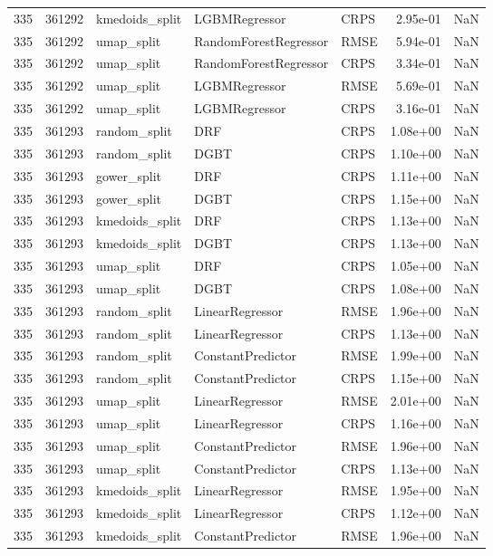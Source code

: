 \begin{tabular}{rrlllrr}
335 & 361292 & kmedoids\_split & LGBMRegressor & CRPS & 2.95e-01 & NaN \\
335 & 361292 & umap\_split & RandomForestRegressor & RMSE & 5.94e-01 & NaN \\
335 & 361292 & umap\_split & RandomForestRegressor & CRPS & 3.34e-01 & NaN \\
335 & 361292 & umap\_split & LGBMRegressor & RMSE & 5.69e-01 & NaN \\
335 & 361292 & umap\_split & LGBMRegressor & CRPS & 3.16e-01 & NaN \\
335 & 361293 & random\_split & DRF & CRPS & 1.08e+00 & NaN \\
335 & 361293 & random\_split & DGBT & CRPS & 1.10e+00 & NaN \\
335 & 361293 & gower\_split & DRF & CRPS & 1.11e+00 & NaN \\
335 & 361293 & gower\_split & DGBT & CRPS & 1.15e+00 & NaN \\
335 & 361293 & kmedoids\_split & DRF & CRPS & 1.13e+00 & NaN \\
335 & 361293 & kmedoids\_split & DGBT & CRPS & 1.13e+00 & NaN \\
335 & 361293 & umap\_split & DRF & CRPS & 1.05e+00 & NaN \\
335 & 361293 & umap\_split & DGBT & CRPS & 1.08e+00 & NaN \\
335 & 361293 & random\_split & LinearRegressor & RMSE & 1.96e+00 & NaN \\
335 & 361293 & random\_split & LinearRegressor & CRPS & 1.13e+00 & NaN \\
335 & 361293 & random\_split & ConstantPredictor & RMSE & 1.99e+00 & NaN \\
335 & 361293 & random\_split & ConstantPredictor & CRPS & 1.15e+00 & NaN \\
335 & 361293 & umap\_split & LinearRegressor & RMSE & 2.01e+00 & NaN \\
335 & 361293 & umap\_split & LinearRegressor & CRPS & 1.16e+00 & NaN \\
335 & 361293 & umap\_split & ConstantPredictor & RMSE & 1.96e+00 & NaN \\
335 & 361293 & umap\_split & ConstantPredictor & CRPS & 1.13e+00 & NaN \\
335 & 361293 & kmedoids\_split & LinearRegressor & RMSE & 1.95e+00 & NaN \\
335 & 361293 & kmedoids\_split & LinearRegressor & CRPS & 1.12e+00 & NaN \\
335 & 361293 & kmedoids\_split & ConstantPredictor & RMSE & 1.96e+00 & NaN \\

\end{tabular}

